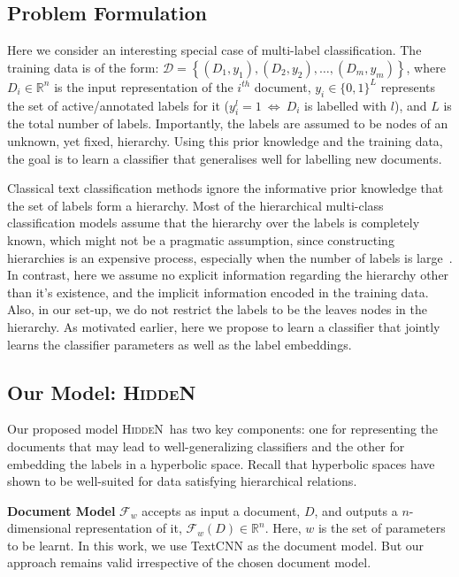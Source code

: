 \documentclass[11pt,a4paper]{article}
\def\R{\mathbb{R}}
\newcommand{\model}{\mbox{\textsc{HiddeN}}}
\begin{document}
\subsection{Problem Formulation \label{sec:probformulation}} 
Here we consider an interesting special case of multi-label classification. The training data is of the form: $\mathcal{D} = \left\{\left(D_1,y_1\right), \left(D_2,y_2\right), \ldots, \left(D_m,y_m\right)\right\}$, where $D_i\in\R^n$ is the input representation of the $i^{th}$ document, $y_i\in\{0,1\}^L$ represents the set of active/annotated labels for it ($y_i^l=1\ \iff\ D_i$ is labelled with $l$), and $L$ is the total number of labels. Importantly, the labels are assumed to be nodes of an unknown, yet fixed, hierarchy.  Using this prior knowledge and the training data, the goal is to learn a classifier that generalises well for labelling new documents.

Classical text classification methods ignore the informative prior knowledge that the set of labels form a hierarchy. Most of the hierarchical multi-class classification models assume that the hierarchy over the labels is completely known, which might not be a pragmatic assumption, since constructing hierarchies is an expensive process, especially when the number of labels is large~\cite{extreme}.  In contrast, here we assume no explicit information regarding the hierarchy other than it's existence, and the implicit information encoded in the training data. Also, in our set-up, we do not restrict the labels to be the leaves nodes in the hierarchy. As motivated earlier, here we propose to learn a classifier that jointly learns the classifier parameters as well as the label embeddings.

\subsection{Our Model: \model}
Our proposed model \model\ has two key components: one for representing the documents that may lead to well-generalizing classifiers and the other for embedding the labels in a hyperbolic space. Recall that hyperbolic spaces have shown to be well-suited for data satisfying hierarchical relations.

\textbf{Document Model} $\mathcal{F}_w$ accepts as input a document, $D$, and outputs a $n$-dimensional representation of it, $\mathcal{F}_w(D)\in\R^n$. Here, $w$ is the set of parameters to be learnt. In this work, we use TextCNN \citep{textcnn} as the document model. But our approach remains valid irrespective of the chosen document model.
\end{document}
